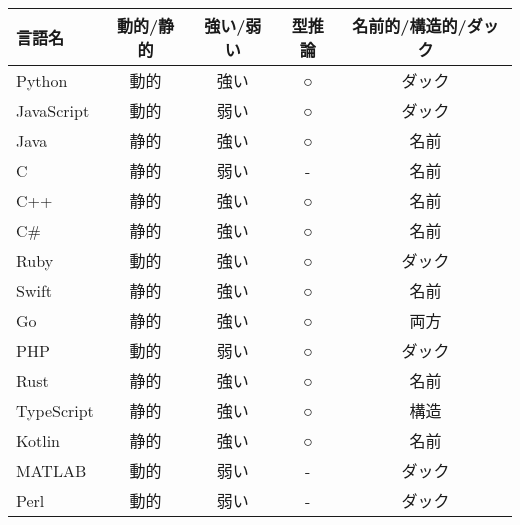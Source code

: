 \documentclass[a4paper]{ltjsreport}
\begin{document}
\begin{center}
  \begin{tabular}{|l|c|c|c|c|}
    \hline
    \textbf{言語名} & \textbf{動的/静的} & \textbf{強い/弱い} & \textbf{型推論} & \textbf{名前的/構造的/ダック} \\
    \hline
    Python          & {\color{red}動的}  & {\color{red}強い}  & {○}             & ダック                        \\
    JavaScript      & {\color{red}動的}  & {\color{blue}弱い} & {○}             & ダック                        \\
    Java            & {\color{blue}静的} & {\color{red}強い}  & {○}             & 名前                          \\
    C               & {\color{blue}静的} & {\color{blue}弱い} & {-}             & 名前                          \\
    C++             & {\color{blue}静的} & {\color{red}強い}  & {○}             & 名前                          \\
    C\#             & {\color{blue}静的} & {\color{red}強い}  & {○}             & 名前                          \\
    Ruby            & {\color{red}動的}  & {\color{red}強い}  & {○}             & ダック                        \\
    Swift           & {\color{blue}静的} & {\color{red}強い}  & {○}             & 名前                          \\
    Go              & {\color{blue}静的} & {\color{red}強い}  & {○}             & 両方                          \\
    PHP             & {\color{red}動的}  & {\color{blue}弱い} & {○}             & ダック                        \\
    Rust            & {\color{blue}静的} & {\color{red}強い}  & {○}             & 名前                          \\
    TypeScript      & {\color{blue}静的} & {\color{red}強い}  & {○}             & 構造                          \\
    Kotlin          & {\color{blue}静的} & {\color{red}強い}  & {○}             & 名前                          \\
    MATLAB          & {\color{red}動的}  & {\color{blue}弱い} & {-}             & ダック                        \\
    Perl            & {\color{red}動的}  & {\color{blue}弱い} & {-}             & ダック                        \\

\end{tabular}
\end{center}
\end{document}
